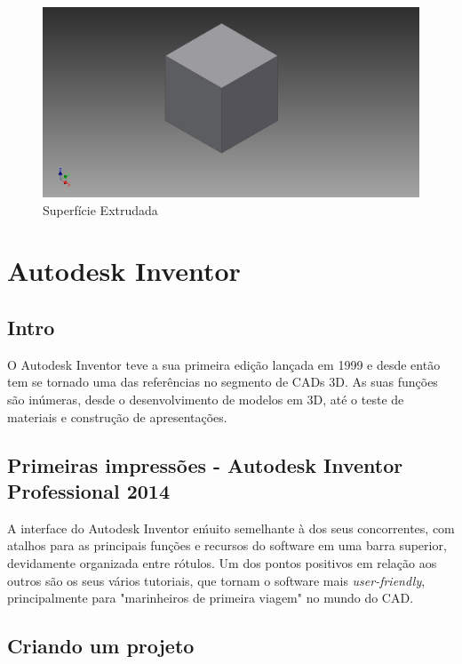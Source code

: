 	\begin{figure}[h]
	\includegraphics[scale=0.3]{./include/chapters/sections/mec/section1/imgs/rev.png}
	\caption{Superf\'icie Extrudada}
	\label{Ext}
	\end{figure}
\newpage
\section{Autodesk Inventor}

\subsection{Intro}

	O Autodesk Inventor teve a sua primeira edi\c{c}\~ao lançada em 1999 e desde ent\~ao tem se tornado uma das refer\^encias no segmento de CADs 3D. As suas fun\c{c}\~oes são in\'umeras, desde o desenvolvimento de modelos em 3D, at\'e o teste de materiais e constru\c{c}\~ao de apresenta\c{c}\~oes.

\subsection{Primeiras impressões - Autodesk Inventor Professional 2014}

A interface do Autodesk Inventor e\' muito semelhante  \`a dos seus concorrentes, com atalhos para as principais funç\~oes e recursos do software em uma barra superior, devidamente organizada entre r\'otulos. Um dos pontos positivos em rela\c{c}\~ao aos outros s\~ao os seus v\'arios tutoriais, que tornam o  software mais {\it user-friendly}, principalmente para "marinheiros de primeira viagem" no mundo do CAD.
\\	

\subsection{Criando um projeto}


